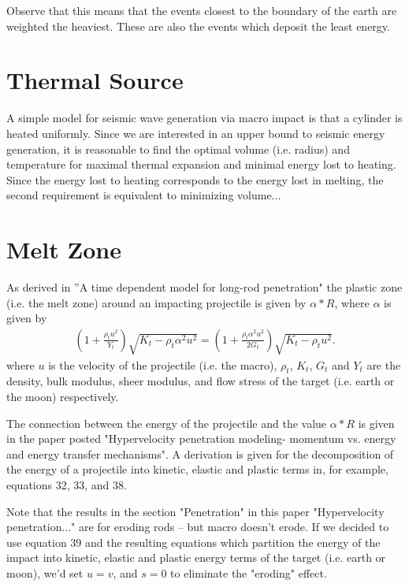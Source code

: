 \documentclass{article}
\begin{document}
Observe that this means that the events closest to the boundary of the earth are weighted the heaviest. These are also the events which deposit the least energy.

\pagebreak
\section{Thermal Source}
A simple model for seismic wave generation via macro impact is that a cylinder is heated uniformly. Since we are interested in an upper bound to seismic energy generation, it is reasonable to find the optimal volume (i.e. radius) and temperature for maximal thermal expansion and minimal energy lost to heating. Since the energy lost to heating corresponds to the energy lost in melting, the second requirement is equivalent to minimizing volume... 
\pagebreak
\section{Melt Zone}
As derived in ''A time dependent model for long-rod penetration" the plastic zone (i.e. the melt zone) around an impacting projectile is given by $\alpha*R$, where $\alpha$ is given by 
\begin{align}
(1+\frac{\rho_t u^2}{Y_t})\sqrt{K_t - \rho_t \alpha^2 u^2} = (1+\frac{\rho_t \alpha^2 u^2}{2G_t})\sqrt{K_t - \rho_t u^2}.
\end{align}
where $u$ is the velocity of the projectile (i.e. the macro), $\rho_t$, $K_t$, $G_t$ and $Y_t$ are the density, bulk modulus, sheer modulus, and flow stress of the target (i.e. earth or the moon) respectively.

The connection between the energy of the projectile and the value $\alpha*R$ is given in the paper posted "Hypervelocity penetration modeling- momentum vs. energy and energy transfer mechanisms". A derivation is given for the decomposition of the energy of a projectile into kinetic, elastic and plastic terms in, for example, equations 32, 33, and 38.

Note that the results in the section "Penetration" in this paper "Hypervelocity penetration..." are for eroding rods -- but macro doesn't erode.  If we decided to use equation 39 and the resulting equations which partition the energy of the impact into kinetic, elastic and plastic energy terms of the target (i.e. earth or moon), we'd set $u = v$, and $s = 0$ to eliminate the "eroding" effect.
\end{document}
